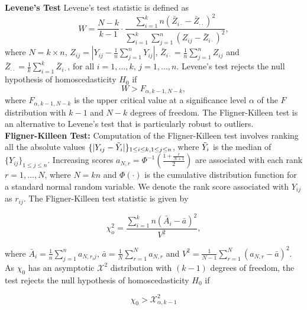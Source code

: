 \documentclass[jair,twoside,11pt,theapa]{article}
\theoremstyle{definition}
\begin{document}
\noindent \textbf{Levene's Test}
Levene's test statistic is defined as
\begin{equation*}
    W = \frac{N - k}{k - 1} \cdot \frac{\sum_{i=1}^{k} n (\bar{Z}_{i \cdot} - \bar{Z}_{\cdot \cdot})^2}{\sum_{i=1}^{k} \sum_{j=1}^{n} (Z_{i j} - \bar{Z}_{i \cdot})^2},
\end{equation*}
where $N = k\times n$, $Z_{i j} = |Y_{i j} - \tfrac{1}{n}\sum_{j=1}^{n} Y_{i j}|$, $\bar{Z}_{i \cdot} = \tfrac{1}{n}\sum_{j=1}^{n} Z_{i j}$ and $\bar{Z}_{\cdot \cdot} = \tfrac{1}{k}\sum_{i=1}^{k} \bar{Z}_{i\cdot}$, for all $i = 1, \dots, k$, $j = 1, \dots, n$.
Levene's test rejects the null hypothesis of homoscedasticity $H_0$ if
\begin{equation*}
    W > F_{\alpha, k-1, N - k},
\end{equation*}
where $F_{\alpha, k-1, N - k}$ is the upper critical value at a significance level $\alpha$ of the $F$ distribution with $k-1$ and $N-k$ degrees of freedom. The Fligner-Killeen test is an alternative to Levene's test that is particularly robust to outliers.  \\

\noindent \textbf{Fligner-Killeen Test:}
Computation of the Fligner-Killeen test involves ranking all the absolute values $\{|Y_{i j} - \Tilde{Y}_i|\}_{1\leq i \leq k, 1 \leq j \leq n}$, where $\Tilde{Y}_i$ is the median of $\{Y_{i j}\}_{1 \leq j \leq n}$. Increasing scores $a_{N,r} = \Phi^{-1}\left(\tfrac{1 + \tfrac{r}{N + 1}}{2}\right)$ are associated with each rank $r = 1,\dots, N$, where $N =kn$ and $\Phi(\cdot)$ is the cumulative distribution function for a standard normal random variable. We denote the rank score associated with $Y_{ij}$ as $r_{ij}$. The Fligner-Killeen test statistic is given by

\begin{equation*}
    \chi_{o}^{2}=\frac{\sum_{i=1}^{k} n\left(\bar{A}_{i}-\bar{a}\right)^{2}}{V^{2}},
\end{equation*}

\noindent where $\bar{A}_i = \tfrac{1}{n}\sum_{j=1}^{n} a_{N, r_ij}$, $\bar{a} = \tfrac{1}{N} \sum_{r=1}^{N} a_{N, r}$ and $V^2 = \tfrac{1}{N - 1}\sum_{r=1}^N (a_{N,r} - \bar{a})^2$. As $\chi_0$ has an asymptotic $\mathcal{X}^2$ distribution with $(k-1)$ degrees of freedom, the test rejects the null hypothesis of homoscedasticity $H_0$ if

\begin{equation*}
    \chi_0 > \mathcal{X}^2_{\alpha, k-1}
\end{equation*}
\end{document}
